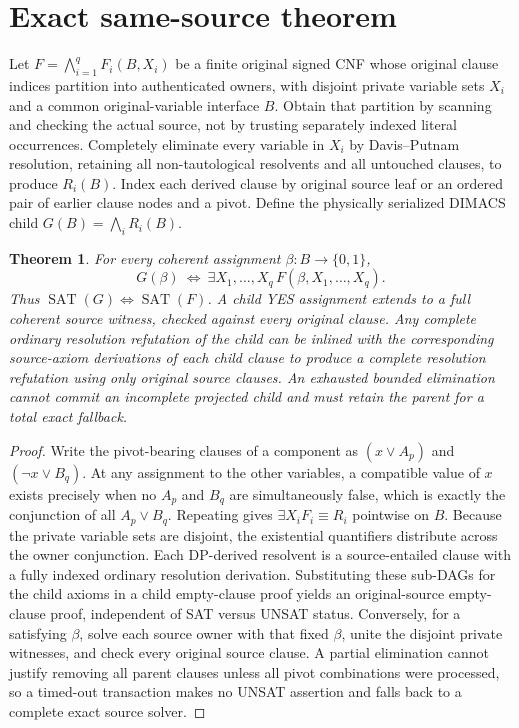 \documentclass[11pt]{article}
\newtheorem{theorem}{Theorem}
\begin{document}
\section{Exact same-source theorem}
Let $F=\bigwedge_{i=1}^qF_i(B,X_i)$ be a finite original signed CNF whose original clause indices partition into authenticated owners, with disjoint private variable sets $X_i$ and a common original-variable interface $B$. Obtain that partition by scanning and checking the actual source, not by trusting separately indexed literal occurrences. Completely eliminate every variable in $X_i$ by Davis--Putnam resolution, retaining all non-tautological resolvents and all untouched clauses, to produce $R_i(B)$. Index each derived clause by original source leaf or an ordered pair of earlier clause nodes and a pivot. Define the physically serialized DIMACS child $G(B)=\bigwedge_i R_i(B)$.
\begin{theorem}
For every coherent assignment $\beta:B\to\{0,1\}$,
\[
G(\beta)\ \Longleftrightarrow\ \exists X_1,\ldots,X_q\,F(\beta,X_1,\ldots,X_q).
\]
Thus $\operatorname{SAT}(G)\iff\operatorname{SAT}(F)$. A child YES assignment extends to a full coherent source witness, checked against every original clause. Any complete ordinary resolution refutation of the child can be inlined with the corresponding source-axiom derivations of each child clause to produce a complete resolution refutation using only original source clauses. An exhausted bounded elimination cannot commit an incomplete projected child and must retain the parent for a total exact fallback.
\end{theorem}
\begin{proof}
Write the pivot-bearing clauses of a component as $(x\vee A_p)$ and $(\neg x\vee B_q)$. At any assignment to the other variables, a compatible value of $x$ exists precisely when no $A_p$ and $B_q$ are simultaneously false, which is exactly the conjunction of all $A_p\vee B_q$. Repeating gives $\exists X_i F_i\equiv R_i$ pointwise on $B$. Because the private variable sets are disjoint, the existential quantifiers distribute across the owner conjunction. Each DP-derived resolvent is a source-entailed clause with a fully indexed ordinary resolution derivation. Substituting these sub-DAGs for the child axioms in a child empty-clause proof yields an original-source empty-clause proof, independent of SAT versus UNSAT status. Conversely, for a satisfying $\beta$, solve each source owner with that fixed $\beta$, unite the disjoint private witnesses, and check every original source clause. A partial elimination cannot justify removing all parent clauses unless all pivot combinations were processed, so a timed-out transaction makes no UNSAT assertion and falls back to a complete exact source solver.\end{proof}
\end{document}
